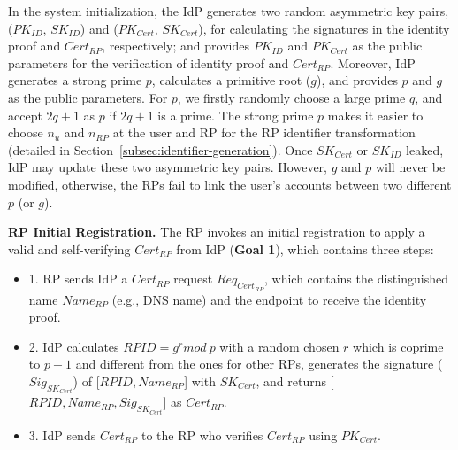 In the system initialization, the IdP generates two random asymmetric key pairs, ($PK_{ID}$, $SK_{ID}$) and ($PK_{Cert}$, $SK_{Cert}$), 
for calculating the signatures in the identity proof and $Cert_{RP}$, respectively; 
and provides $PK_{ID}$ and $PK_{Cert}$ as the public parameters for the verification of identity proof and $Cert_{RP}$. 
Moreover, IdP generates a strong prime $p$, calculates  a primitive root ($g$), and provides $p$ and $g$ as the public parameters. 
For $p$, we firstly randomly choose a large prime $q$, and accept  $2q+1$ as $p$ if $2q+1$ is a prime. 
The strong prime $p$ makes it easier to choose $n_{u}$ and $n_{RP}$ at the user and RP for the RP identifier transformation (detailed in  Section~\ref{subsec:identifier-generation}). %
Once $SK_{Cert}$ or $SK_{ID}$ leaked, IdP may update these two asymmetric key pairs.
However, $g$ and $p$ will never be modified, otherwise, the RPs fail to link the user's accounts between two different $p$ (or $g$).



\noindent\textbf{RP Initial Registration.} 
The RP invokes an initial registration to apply a valid and self-verifying $Cert_{RP}$ from IdP (\textbf{Goal 1}),
 which contains three steps:

\begin{itemize}
\item 1. RP sends IdP a $Cert_{RP}$ request $Req_{Cert_{RP}}$, which contains the distinguished name $Name_{RP}$ (e.g., DNS name) and the endpoint to receive the identity proof.
\item 2. IdP calculates $RPID = g^r mod \ p$ with a random chosen $r$ which is coprime to $p-1$ and different from the ones for other RPs,  generates the signature ($Sig_{SK_{Cert}}$) of [$RPID, Name_{RP}$] with $SK_{Cert}$, and returns [$RPID, Name_{RP}, Sig_{SK_{Cert}}$] as $Cert_{RP}$.
\item 3. IdP sends $Cert_{RP}$ to the RP who verifies $Cert_{RP}$ using $PK_{Cert}$.
\end{itemize}


